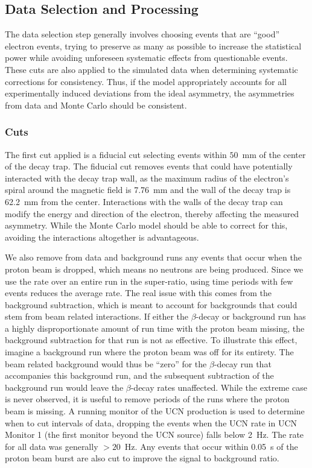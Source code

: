 \subsection{Data Selection and Processing}

The data selection step generally involves choosing events that are ``good'' electron
events, trying to preserve as many as possible to increase the statistical power while avoiding
unforeseen systematic effects from questionable events. These cuts are also applied to
the simulated data when determining systematic corrections for consistency. Thus, if the
model appropriately accounts for all experimentally induced deviations from the ideal
asymmetry, the asymmetries from data and Monte Carlo should be consistent.

\subsubsection{Cuts} \label{ssec:dataCuts}%

The first cut applied is a fiducial cut
selecting events within $50$~mm of the center of the decay trap. The fiducial cut removes
events that could have potentially interacted with the decay trap wall, as the
maximum radius of the electron's spiral around the magnetic field is 7.76~mm and the wall
of the decay trap is 62.2~mm from the center. Interactions with the walls of the decay trap
can modify the energy and direction of the electron, thereby affecting the measured
asymmetry. While the Monte Carlo model should be able to correct for this, avoiding the
interactions altogether is advantageous.

We also remove from data and background runs
any events that occur when the proton beam is dropped, which means no neutrons
are being produced. Since we use the rate over an entire run in the super-ratio,
using time periods with few events reduces the average rate. The real issue with this comes
from the background subtraction, which is meant to account for backgrounds that could stem
from beam related interactions. If either the $\beta$-decay or background run has a
highly disproportionate amount of run time with the proton beam missing, the background
subtraction for that run is not as effective. To illustrate this effect, imagine a background
run where the proton beam was off for its entirety. The beam related background would thus be
``zero'' for the $\beta$-decay run that accompanies this background run, and the subsequent
subtraction of the background run would leave the $\beta$-decay rates unaffected.
While the extreme case is never observed, it is useful to remove
periods of the runs where the proton beam is missing. A running monitor of the UCN production is
used to determine when to cut intervals of data, dropping the events when the UCN rate
in UCN Monitor 1 (the first monitor beyond the UCN source) falls below 2~Hz.
The rate for all data was generally $>20$~Hz.
Any events that occur within 0.05~s of the proton beam burst are also cut to improve
the signal to background ratio.

